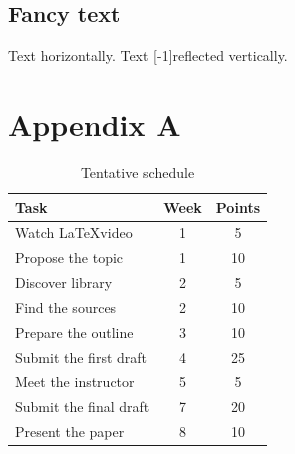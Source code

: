 \documentclass[nonacm]{acmart}
\begin{document}
\clearpage

\subsection{Fancy text}

Text  horizontally. Text \scalebox{1}[-1]{reflected}
vertically.




\clearpage
\section*{Appendix A}

\begin{table}[!htbp]
    \centering
    \caption{Tentative schedule}
    \label{tbl:schedule}
    \begin{tabular}{l c c}
        \hline
        Task                    & Week & Points \\
        \hline
        Watch \LaTeX video      & 1    & 5      \\
        Propose the topic       & 1    & 10     \\
        Discover library        & 2    & 5      \\
        Find the sources        & 2    & 10     \\
        Prepare the outline     & 3    & 10     \\
        Submit the first draft  & 4    & 25     \\
        Meet the instructor     & 5    & 5      \\
        Submit the final draft  & 7    & 20     \\
        Present the paper       & 8    & 10     \\
        \hline
    \end{tabular}
\end{table}
\end{document}
